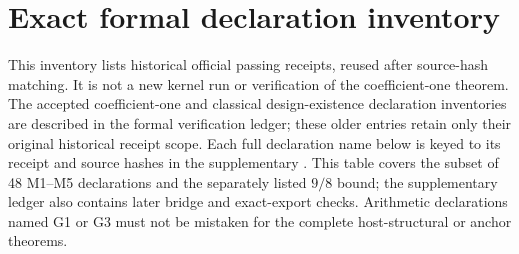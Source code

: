 \section{Exact formal declaration inventory}
\label{app:formal}
This inventory lists historical official passing receipts, reused after source-hash matching. It is not a new kernel run or verification of the coefficient-one theorem. The accepted coefficient-one and classical design-existence declaration inventories are described in the formal verification ledger; these older entries retain only their original historical receipt scope. Each full declaration name below is keyed to its receipt and source hashes in the supplementary . This table covers the subset of 48 M1--M5 declarations and the separately listed $9/8$ bound; the supplementary ledger also contains later bridge and exact-export checks. Arithmetic declarations named G1 or G3 must not be mistaken for the complete host-structural or anchor theorems.
